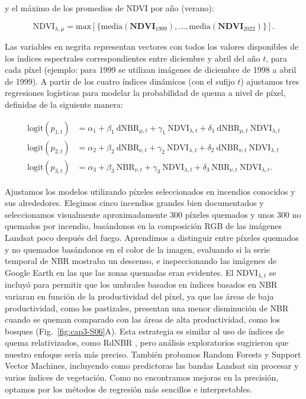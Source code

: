 \noindent y el máximo de los promedios de NDVI por año (verano):

\[
\text{NDVI}_{\lambda,\mu} = \text{max}[\{\text{media}(\textbf{NDVI}_{1999}), ..., \text{media}(\textbf{NDVI}_{2022})\}].
\]

\noindent Las variables en negrita representan vectores con todos los valores disponibles de los índices espectrales correspondientes entre diciembre y abril del año $t$, para cada píxel (ejemplo: para 1999 se utilizan imágenes de diciembre de 1998 a abril de 1999). A partir de los cuatro índices dinámicos (con el sufijo $t$) ajustamos tres regresiones logísticas para modelar la probabilidad de quema a nivel de píxel, definidas de la siguiente manera: 

\begin{equation}
\begin{aligned}
\text{logit}(p_{1,t}) &=  \alpha_1 + \beta_1 \ \text{dNBR}_{\mu,t}  +  \gamma_1 \ \text{NDVI}_{\lambda,t} + \delta_1 \ \text{dNBR}_{\mu,t} \ \text{NDVI}_{\lambda,t} \\
\text{logit}(p_{2,t}) &=  \alpha_2 + \beta_2 \ \text{dNBR}_{\nu,t}  +  \gamma_2 \ \text{NDVI}_{\lambda,t} + \delta_2 \ \text{dNBR}_{\nu,t} \ \text{NDVI}_{\lambda,t} \\
\text{logit}(p_{3,t}) &=  \alpha_3 + \beta_3 \ \text{NBR}_{\nu,t}  +  \gamma_3 \ \text{NDVI}_{\lambda,t} + \delta_3 \ \text{NBR}_{\nu,t} \ \text{NDVI}_{\lambda,t}.
\end{aligned}
\label{eq:cap3-burnmap}
\end{equation}

Ajustamos los modelos utilizando píxeles seleccionados en incendios conocidos y sus alrededores. Elegimos cinco incendios grandes bien documentados y seleccionamos visualmente aproximadamente 300 píxeles quemados y unos 300 no quemados por incendio, basándonos en la composición RGB de las imágenes Landsat poco después del fuego. Aprendimos a distinguir entre píxeles quemados y no quemados basándonos en el color de la imagen, evaluando si la serie temporal de NBR mostraba un descenso, e inspeccionando las imágenes de Google Earth en las que las zonas quemadas eran evidentes. El $\text{NDVI}_{\lambda,t}$ se incluyó para permitir que los umbrales basados en índices basados en NBR variaran en función de la productividad del píxel, ya que las áreas de baja productividad, como los pastizales, presentan una menor disminución de NBR cuando se queman comparado con las áreas de alta productividad, como los bosques (Fig.~\ref{fig:cap3-S06}A). Esta estrategia es similar al uso de índices de quema relativizados, como RdNBR \citep{miller2007rdNBR}, pero análisis exploratorios sugirieron que nuestro enfoque sería más preciso. También probamos Random Forests y Support Vector Machines, incluyendo como predictoras las bandas Landsat sin procesar y varios índices de vegetación. Como no encontramos mejoras en la precisión, optamos por los métodos de regresión más sencillos e interpretables.


